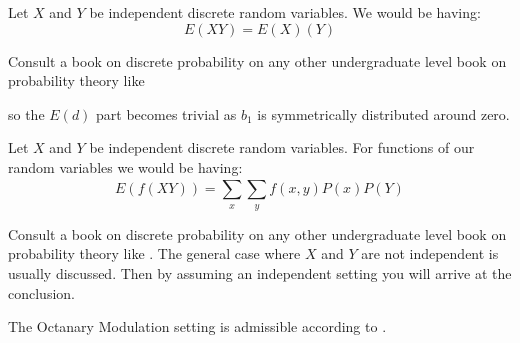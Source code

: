\begin{Thm}
	Let $X$ and $Y$ be independent discrete random variables. We would be having:
	\begin{equation*}
		E(XY) = E(X)(Y)
	\end{equation*}
\end{Thm}
\begin{Proof}
Consult a book on discrete probability on any other undergraduate level book on probability theory like \cite{Chung2003}
\end{Proof}
		
  so the $E(d)$ part becomes trivial as $b_1$ is symmetrically distributed around zero. 

  \begin{Thm}
	Let $X$ and $Y$ be independent discrete random variables. For functions of our random variables we would be having:
	\begin{equation*}
		E(f(XY)) = \sum_{x}^{}\sum_{y}^{}f(x,y)P(x)P(Y)
	\end{equation*}
\end{Thm}
\begin{Proof}
	Consult a book on discrete probability on any other undergraduate level book on probability theory like \cite{DasGupta2011}.
	The general case where $X$ and $Y$ are not independent is usually discussed. Then by assuming an independent setting 
	you will arrive at the conclusion.
	\end{Proof}



\begin{Prop}
	The Octanary Modulation setting is admissible according to \cite{Candes2014}. 
	
\end{Prop}

